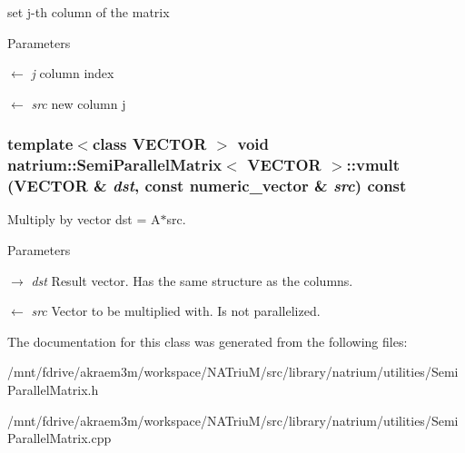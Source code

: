 set j-\/th column of the matrix 
\begin{DoxyParams}{Parameters}
\item[\mbox{$\leftarrow$} {\em j}]column index \item[\mbox{$\leftarrow$} {\em src}]new column j \end{DoxyParams}
\hypertarget{classnatrium_1_1SemiParallelMatrix_a544535d18e218d58541bf4a275ee96b2}{
\subsubsection[{vmult}]{\setlength{\rightskip}{0pt plus 5cm}template$<$class VECTOR $>$ void {\bf natrium::SemiParallelMatrix}$<$ VECTOR $>$::vmult (VECTOR \& {\em dst}, \/  const numeric\_\-vector \& {\em src}) const}}
\label{classnatrium_1_1SemiParallelMatrix_a544535d18e218d58541bf4a275ee96b2}


Multiply by vector dst = A$\ast$src. 
\begin{DoxyParams}{Parameters}
\item[\mbox{$\rightarrow$} {\em dst}]Result vector. Has the same structure as the columns. \item[\mbox{$\leftarrow$} {\em src}]Vector to be multiplied with. Is not parallelized. \end{DoxyParams}


The documentation for this class was generated from the following files:\begin{DoxyCompactItemize}
\item 
/mnt/fdrive/akraem3m/workspace/NATriuM/src/library/natrium/utilities/SemiParallelMatrix.h\item 
/mnt/fdrive/akraem3m/workspace/NATriuM/src/library/natrium/utilities/SemiParallelMatrix.cpp\end{DoxyCompactItemize}
